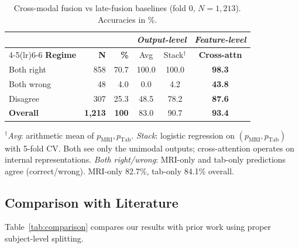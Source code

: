 \documentclass[conference]{IEEEtran}
\begin{document}
\begin{table}[htbp]
\caption{Cross-modal fusion vs late-fusion baselines (fold 0, $N=1{,}213$). Accuracies in \%.}
\begin{center}
\footnotesize
\setlength{\tabcolsep}{3pt}
\begin{tabular}{@{}lrrccc@{}}
\toprule
 & & & \multicolumn{2}{c}{\emph{Output-level}} & \emph{Feature-level} \\
\cmidrule(lr){4-5}\cmidrule(lr){6-6}
\textbf{Regime} & \textbf{N} & \textbf{\%} & Avg & Stack$^\dag$ & \textbf{Cross-attn} \\
\midrule
Both right       &  858 & 70.7 & 100.0 & 100.0 & \textbf{98.3} \\
Both wrong       &   48 &  4.0 &   0.0 &   4.2 & \textbf{43.8} \\
Disagree         &  307 & 25.3 &  48.5 &  78.2 & \textbf{87.6} \\
\midrule
\textbf{Overall} & \textbf{1{,}213} & \textbf{100} & 83.0 & 90.7 & \textbf{93.4} \\
\bottomrule
\end{tabular}
\label{tab:concordance}
\end{center}
\vspace{-2mm}
{\scriptsize $^\dag$\emph{Avg}: arithmetic mean of $p_\mathrm{MRI}, p_\mathrm{Tab}$. \emph{Stack}: logistic regression on $(p_\mathrm{MRI}, p_\mathrm{Tab})$ with 5-fold CV. Both see only the unimodal outputs; cross-attention operates on internal representations. \emph{Both right/wrong}: MRI-only and tab-only predictions agree (correct/wrong). MRI-only 82.7\%, tab-only 84.1\% overall.}
\end{table}

\subsection{Comparison with Literature}

Table~\ref{tab:comparison} compares our results with prior work using proper subject-level splitting.
\end{document}
